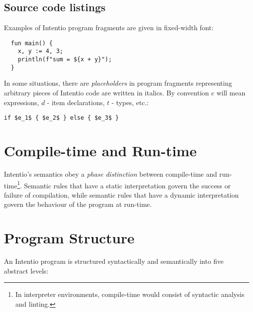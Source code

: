 \subsection*{Source code listings}

Examples of Intentio program fragments are given in fixed-width font:

\begin{lstlisting}
  fun main() {
    x, y := 4, 3;
    println(f"sum = ${x + y}");
  }
\end{lstlisting}

In some situations, there are \emph{placeholders} in program fragments representing arbitrary pieces of Intentio code are written in italics. By convention $e$ will mean expressions, $d$ - item declarations, $t$ - types, etc.:

\begin{lstlisting}[mathescape=true]
  if $e_1$ { $e_2$ } else { $e_3$ }
\end{lstlisting}


\section{Compile-time and Run-time}

Intentio's semantics obey a \emph{phase distinction} between compile-time and run-time\footnote{In interpreter environments, compile-time would consist of syntactic analysis and linting.}. Semantic rules that have a static interpretation govern the success or failure of compilation, while semantic rules that have a dynamic interpretation govern the behaviour of the program at run-time.


\section{Program Structure}

An Intentio program is structured syntactically and semantically into five abstract levels:

